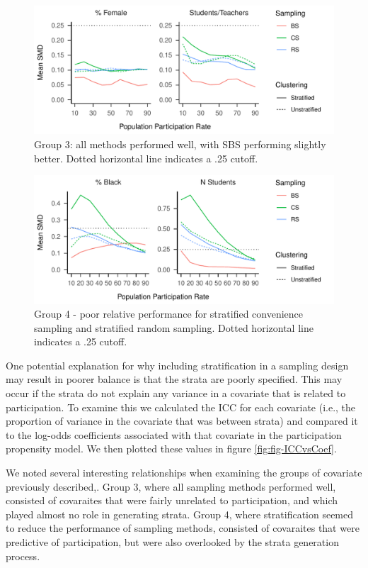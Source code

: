 \documentclass[man,floatsintext]{apa6}
\begin{document}
\begin{figure}
\centering
\includegraphics{GenSamp-Paper_files/figure-latex/fig-SMD-by-Var-neutral-1.pdf}
\caption{\label{fig:fig-SMD-by-Var-neutral}Group 3: all methods performed well, with SBS performing slightly better. Dotted horizontal line indicates a .25 cutoff.}
\end{figure}

\begin{figure}
\centering
\includegraphics{GenSamp-Paper_files/figure-latex/fig-SMD-by-Var-bad-1.pdf}
\caption{\label{fig:fig-SMD-by-Var-bad}Group 4 - poor relative performance for stratified convenience sampling and stratified random sampling. Dotted horizontal line indicates a .25 cutoff.}
\end{figure}

One potential explanation for why including stratification in a sampling design may result in poorer balance is that the strata are poorly specified. This may occur if the strata do not explain any variance in a covariate that is related to participation. To examine this we calculated the ICC for each covariate (i.e., the proportion of variance in the covariate that was between strata) and compared it to the log-odds coefficients associated with that covariate in the participation propensity model. We then plotted these values in figure \ref{fig:fig-ICCvsCoef}.

We noted several interesting relationships when examining the groups of covariate previously described,. Group 3, where all sampling methods performed well, consisted of covaraites that were fairly unrelated to participation, and which played almost no role in generating strata. Group 4, where stratification seemed to reduce the performance of sampling methods, consisted of covaraites that were predictive of participation, but were also overlooked by the strata generation process.
\end{document}
